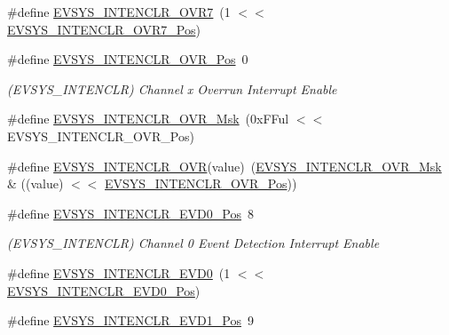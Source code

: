 \begin{DoxyCompactItemize}
\#define \mbox{\hyperlink{group___s_a_m_d21___e_v_s_y_s_gab5b1bf3c8fc7666fb16065540607ac3e}{E\+V\+S\+Y\+S\+\_\+\+I\+N\+T\+E\+N\+C\+L\+R\+\_\+\+O\+V\+R7}}~(1 $<$$<$ \mbox{\hyperlink{group___s_a_m_d21___e_v_s_y_s_gac509056e9b76f2bf5cdc1968b2a079eb}{E\+V\+S\+Y\+S\+\_\+\+I\+N\+T\+E\+N\+C\+L\+R\+\_\+\+O\+V\+R7\+\_\+\+Pos}})
\item 
\#define \mbox{\hyperlink{group___s_a_m_d21___e_v_s_y_s_gafee2a545114cf715716165d6590ac9cc}{E\+V\+S\+Y\+S\+\_\+\+I\+N\+T\+E\+N\+C\+L\+R\+\_\+\+O\+V\+R\+\_\+\+Pos}}~0
\begin{DoxyCompactList}\small\item\em (E\+V\+S\+Y\+S\+\_\+\+I\+N\+T\+E\+N\+C\+LR) Channel x Overrun Interrupt Enable \end{DoxyCompactList}\item 
\#define \mbox{\hyperlink{group___s_a_m_d21___e_v_s_y_s_ga8b07d636b3cc0fed1db4c969ca9eec79}{E\+V\+S\+Y\+S\+\_\+\+I\+N\+T\+E\+N\+C\+L\+R\+\_\+\+O\+V\+R\+\_\+\+Msk}}~(0x\+F\+Ful $<$$<$ E\+V\+S\+Y\+S\+\_\+\+I\+N\+T\+E\+N\+C\+L\+R\+\_\+\+O\+V\+R\+\_\+\+Pos)
\item 
\#define \mbox{\hyperlink{group___s_a_m_d21___e_v_s_y_s_gaac35c26da6b2d918540a611f6f3a2f65}{E\+V\+S\+Y\+S\+\_\+\+I\+N\+T\+E\+N\+C\+L\+R\+\_\+\+O\+VR}}(value)~(\mbox{\hyperlink{group___s_a_m_d21___e_v_s_y_s_ga8b07d636b3cc0fed1db4c969ca9eec79}{E\+V\+S\+Y\+S\+\_\+\+I\+N\+T\+E\+N\+C\+L\+R\+\_\+\+O\+V\+R\+\_\+\+Msk}} \& ((value) $<$$<$ \mbox{\hyperlink{group___s_a_m_d21___e_v_s_y_s_gafee2a545114cf715716165d6590ac9cc}{E\+V\+S\+Y\+S\+\_\+\+I\+N\+T\+E\+N\+C\+L\+R\+\_\+\+O\+V\+R\+\_\+\+Pos}}))
\item 
\#define \mbox{\hyperlink{group___s_a_m_d21___e_v_s_y_s_ga3ba80aa7fc515424670c352a69f6ffa7}{E\+V\+S\+Y\+S\+\_\+\+I\+N\+T\+E\+N\+C\+L\+R\+\_\+\+E\+V\+D0\+\_\+\+Pos}}~8
\begin{DoxyCompactList}\small\item\em (E\+V\+S\+Y\+S\+\_\+\+I\+N\+T\+E\+N\+C\+LR) Channel 0 Event Detection Interrupt Enable \end{DoxyCompactList}\item 
\#define \mbox{\hyperlink{group___s_a_m_d21___e_v_s_y_s_gabafb6938bb647b456d9ab61686113d50}{E\+V\+S\+Y\+S\+\_\+\+I\+N\+T\+E\+N\+C\+L\+R\+\_\+\+E\+V\+D0}}~(1 $<$$<$ \mbox{\hyperlink{group___s_a_m_d21___e_v_s_y_s_ga3ba80aa7fc515424670c352a69f6ffa7}{E\+V\+S\+Y\+S\+\_\+\+I\+N\+T\+E\+N\+C\+L\+R\+\_\+\+E\+V\+D0\+\_\+\+Pos}})
\item 
\#define \mbox{\hyperlink{group___s_a_m_d21___e_v_s_y_s_gabd12d170f66f38972e54314834495117}{E\+V\+S\+Y\+S\+\_\+\+I\+N\+T\+E\+N\+C\+L\+R\+\_\+\+E\+V\+D1\+\_\+\+Pos}}~9

\end{DoxyCompactItemize}
